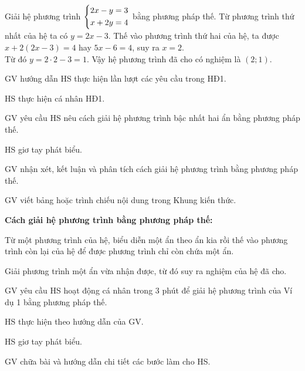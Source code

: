 \begin{vidu}
    Giải hệ phương trình $\left\{\begin{aligned}&2x-y=3\\&x+2y=4\end{aligned}\right.$ bằng phương pháp thế.
    \doicot
    Từ phương trình thứ nhất của hệ ta có $y = 2x - 3$. Thế vào phương trình thứ hai của hệ, ta được $x + 2(2x - 3) = 4$ hay $5x - 6 = 4$, suy ra $x = 2$.\\
    Từ đó $y = 2 \cdot 2 - 3 = 1$. Vậy hệ phương trình đã cho có nghiệm là $(2; 1)$.
\end{vidu}

\tochucthuchien

\begin{tcth}[ttkp]
    \buocmot
    \item GV hướng dẫn HS thực hiện lần lượt các yêu cầu trong HĐ1.
    \buochai
    \item HS thực hiện cá nhân HĐ1. 
    \buocba
    \item GV yêu cầu HS nêu cách giải hệ phương trình bậc nhất hai ẩn bằng phương pháp thế.
    \item HS giơ tay phát biểu.
    \buocbon
    \item GV nhận xét, kết luận và phân tích cách giải hệ phương trình bằng phương pháp thế.
    \item GV viết bảng hoặc trình chiếu nội dung trong Khung kiến thức. 
    \begin{kttt}
        \textbf{Cách giải hệ phương trình bằng phương pháp thế:}
        \begin{cacbuoc}
            \item Từ một phương trình của hệ, biểu diễn một ẩn theo ẩn kia rồi thế vào phương trình còn lại của hệ để được phương trình chỉ còn chứa một ẩn.
            \item Giải phương trình một ẩn vừa nhận được, từ đó suy ra nghiệm của hệ đã cho.
        \end{cacbuoc}
    \end{kttt}
\end{tcth}

\begin{tcth}[vidu=1]
    \buocmot
    \item GV yêu cầu HS hoạt động cá nhân trong 3 phút để giải hệ phương trình của Ví dụ 1 bằng phương pháp thế.
    \buochai
    \item HS thực hiện theo hướng dẫn của GV.
    \buocba
    \item HS giơ tay phát biểu.
    \buocbon
    \item GV chữa bài và hướng dẫn chi tiết các bước làm cho HS.
\end{tcth}

